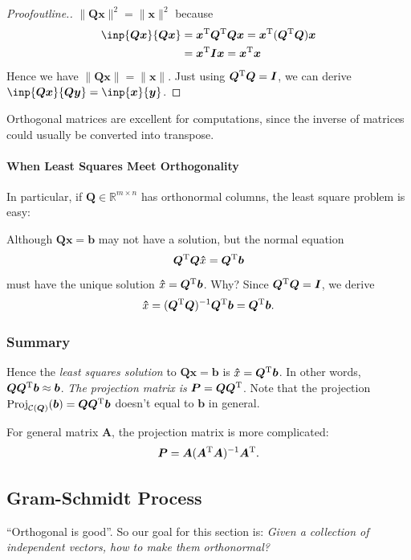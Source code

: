 \begin{proof}[Proofoutline.]
$\|\bm{Qx}\|^2=\|\bm x\|^2$ because
\[\begin{aligned}
\inp{\bm{Qx}}{\bm{Qx}}&=\bm x\trans\bm Q\trans\bm Q\bm x=\bm x\trans(\bm Q\trans\bm Q)\bm x\\
&=\bm x\trans\bm I\bm x=\bm x\trans\bm x
\end{aligned}
\]
Hence we have $\|\bm{Qx}\|=\|\bm x\|$. Just using $\bm Q^{\mathrm T}\bm Q=\bm I$, we can derive $\inp{\bm{Qx}}{\bm{Qy}}=\inp{\bm x}{\bm y}$.
\end{proof}

Orthogonal matrices are excellent for computations, since the inverse of matrices could usually be converted into transpose.

\paragraph{When Least Squares Meet Orthogonality}
In particular, if $\bm Q\in\mathbb{R}^{m\times n}$ has orthonormal columns, the least square problem is easy:

Although $\bm{Qx}=\bm b$ may not have a solution, but the normal equation
\[
\bm Q^{\mathrm T}\bm Q\bm \hat x=\bm Q^{\mathrm T}\bm b
\]
must have the unique solution $\bm\hat x=\bm Q^{\mathrm T}\bm b$. Why? Since $\bm Q^{\mathrm T}\bm Q=\bm I$, we derive 
\[
\bm\hat x=(\bm Q^{\mathrm T}\bm Q)^{-1}\bm Q^{\mathrm T}\bm b=\bm Q^{\mathrm T}\bm b.
\]
\subsubsection{Summary}
Hence the \emph{least squares solution} to $\bm{Qx}=\bm b$ is $\bm\hat x=\bm Q^{\mathrm T}\bm b$. In other words, $\bm Q\bm Q^{\mathrm T}\bm b\approx \bm b$. \emph{The projection matrix is} $\bm P=\bm Q\bm Q^{\mathrm T}$. Note that the projection $\operatorname{Proj}_{\mathcal{C}(\bm Q)}(\bm b)=\bm Q\bm Q^{\mathrm T}\bm b$ doesn't equal to $\bm b$ in general.

For general matrix $\bm A$, the projection matrix is more complicated:
\[
\bm P=\bm A(\bm A^{\mathrm T}\bm A)^{-1}\bm A^{\mathrm T}.
\]
\subsection{Gram-Schmidt Process}
``Orthogonal is good''. So our goal for this section is: \textit{Given a collection of independent vectors, how to make them orthonormal?}

